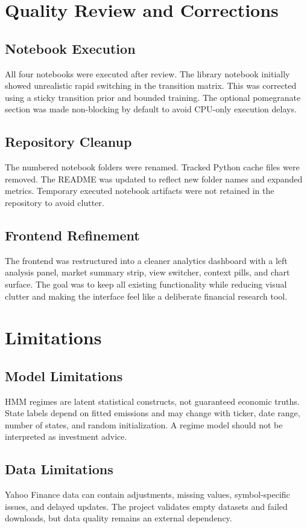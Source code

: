 \documentclass[12pt,a4paper]{report}
\begin{document}
\chapter{Quality Review and Corrections}
\section{Notebook Execution}
All four notebooks were executed after review. The library notebook initially showed unrealistic rapid switching in the transition matrix. This was corrected using a sticky transition prior and bounded training. The optional pomegranate section was made non-blocking by default to avoid CPU-only execution delays.

\section{Repository Cleanup}
The numbered notebook folders were renamed. Tracked Python cache files were removed. The README was updated to reflect new folder names and expanded metrics. Temporary executed notebook artifacts were not retained in the repository to avoid clutter.

\section{Frontend Refinement}
The frontend was restructured into a cleaner analytics dashboard with a left analysis panel, market summary strip, view switcher, context pills, and chart surface. The goal was to keep all existing functionality while reducing visual clutter and making the interface feel like a deliberate financial research tool.

\chapter{Limitations}
\section{Model Limitations}
HMM regimes are latent statistical constructs, not guaranteed economic truths. State labels depend on fitted emissions and may change with ticker, date range, number of states, and random initialization. A regime model should not be interpreted as investment advice.

\section{Data Limitations}
Yahoo Finance data can contain adjustments, missing values, symbol-specific issues, and delayed updates. The project validates empty datasets and failed downloads, but data quality remains an external dependency.
\end{document}
